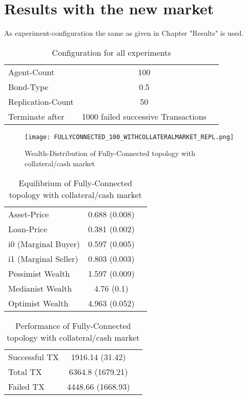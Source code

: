 \documentclass[Bachelorarbeit.tex]{subfiles}
\begin{document}
\section{Results with the new market}	
As experiment-configuration the same as given in Chapter  "Results" is used.

\begin{table}[h]
	\centering
	\caption{Configuration for all experiments}
	\begin{tabular} { l c r }
		\hline
		Agent-Count & 100 \\
		Bond-Type & 0.5 \\
		Replication-Count & 50 \\
		Terminate after & 1000 failed successive Transactions \\
		\hline
	\end{tabular}
\end{table}

\begin{figure}[H]
	\centering
  \texttt{[image: FULLYCONNECTED\_100\_WITHCOLLATERALMARKET\_REPL.png]}
	\caption{Wealth-Distribution of Fully-Connected topology with collateral/cash market}
	\label{fig:wealth_FULLYCONNECTED_100_WITHCOLLATERALMARKET_REPL}
\end{figure}

\begin{table}[h]
	\caption{Equilibrium of Fully-Connected topology with collateral/cash market}
	\centering
	\begin{tabular} { l c r }
		\hline
		Asset-Price & 0.688 (0.008) \\
		Loan-Price & 0.381 (0.002) \\
		i0 (Marginal Buyer) & 0.597 (0.005) \\
		i1 (Marginal Seller) & 0.803 (0.003) \\
		Pessimist Wealth & 1.597 (0.009) \\
		Medianist Wealth & 4.76 (0.1) \\
		Optimist Wealth & 4.963 (0.052) \\
		\hline
	\end{tabular}
\end{table} 

\begin{table}[h]
	\caption{Performance of Fully-Connected topology with collateral/cash market}
	\centering
	\begin{tabular} { l c r }
		\hline
		Successful TX & 1916.14 (31.42) \\
		Total TX & 6364.8 (1679.21) \\
		Failed TX & 4448.66 (1668.93) \\
		\hline
	\end{tabular}
\end{table}
\end{document}
